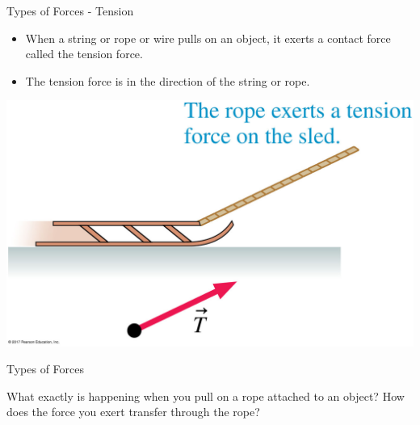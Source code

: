 \documentclass{beamer}
\begin{document}
\begin{frame}{Types of Forces - Tension}
\begin{itemize}
   \item When a string or rope or wire pulls on an object, it exerts a contact force called the tension force.
   \item The tension force is in the direction of the string or rope.
\end{itemize}
\begin{center}
   \includegraphics[width=\textwidth]{../figures/05_05_Figure.jpg}
\end{center}
\end{frame}

\begin{frame}{Types of Forces}
\begin{center}
   What exactly is happening when you pull on a rope attached to an object? How does the force you exert transfer through the rope?
\end{center}
\end{frame}
\end{document}

